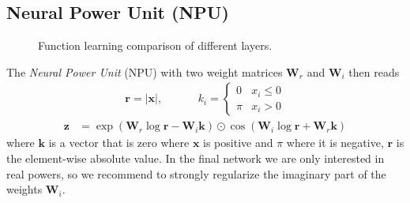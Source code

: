 \documentclass[9pt]{article}
\newcommand{\Wre}{\bm W_{r}}
\newcommand{\Wim}{\bm W_{i}}
\begin{document}
\subsection{Neural Power Unit (NPU)}%
\label{sub:neural_power_unit_npu_}

\begin{figure}
  \centering
  \resizebox{.3\textwidth}{!}{}
  \resizebox{.3\textwidth}{!}{}
  \resizebox{.3\textwidth}{!}{}
  \caption{Function learning comparison of different layers.}%
  \label{fig:sin_comp}
\end{figure}

The \emph{Neural Power Unit} (NPU) with two weight matrices $\Wre$ and $\Wim$
then reads
\begin{align}
  \bm r = |\bm x|,
  \hspace{1cm}
  & k_i = \begin{cases}
     0  & x_i \leq 0 \\
    \pi & x_i > 0
  \end{cases}
\end{align}
\begin{align}
  \bm z &= \exp(\Wre \log\bm r - \Wim\bm k) \odot \cos(\Wim\log \bm r + \Wre\bm k)
\end{align}
where $\bm k$ is a vector that is zero where $\bm x$ is positive and $\pi$
where it is negative, $\bm r$ is the element-wise absolute value.
In the final network we are only interested in real powers, so we recommend to
strongly regularize the imaginary part of the weights $\Wim$.
\end{document}
